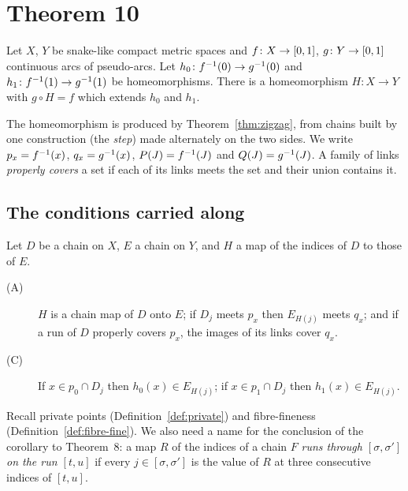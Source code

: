 \chapter{Theorem 10}\label{ch:thm10}

\begin{theorem}\label{thm:bj10}
Let $X$, $Y$ be snake-like compact metric spaces and $f\colon X\to[0,1]$, $g\colon Y\to[0,1]$ continuous arcs of pseudo-arcs. Let $h_0\colon f^{-1}(0)\to g^{-1}(0)$ and
$h_1\colon f^{-1}(1)\to g^{-1}(1)$ be homeomorphisms. There is a homeomorphism $H\colon X\to Y$ with $g\circ H=f$ which extends $h_0$ and $h_1$.
\end{theorem}


The homeomorphism is produced by Theorem~\ref{thm:zigzag}, from chains built by one construction (the \emph{step}) made alternately on the two sides. We write
$p_x=f^{-1}(x)$, $q_x=g^{-1}(x)$, $P(J)=f^{-1}(J)$ and $Q(J)=g^{-1}(J)$. A family of links \emph{properly covers} a set if each of its links meets the set and their union
contains it.

\section{The conditions carried along}

\begin{definition}\label{def:conditions}
Let $D$ be a chain on $X$, $E$ a chain on $Y$, and $H$ a map of the indices of $D$ to those of $E$.
\begin{description}
\item[\textnormal{(A)}] $H$ is a chain map of $D$ onto $E$; if $D_j$ meets $p_x$ then $E_{H(j)}$ meets $q_x$; and if a run of $D$ properly covers $p_x$, the images
of its links cover $q_x$.
\item[\textnormal{(C)}] If $x\in p_0\cap D_j$ then $h_0(x)\in E_{H(j)}$; if $x\in p_1\cap D_j$ then $h_1(x)\in E_{H(j)}$.
\end{description}
\end{definition}


Recall private points (Definition~\ref{def:private}) and fibre-fineness (Definition~\ref{def:fibre-fine}). We also need a name for the conclusion of the
corollary to Theorem~8: a map $R$ of the indices of a chain $F$ \emph{runs through $[\sigma,\sigma']$ on the run $[t,u]$} if every $j\in[\sigma,\sigma']$ is the value of $R$ at
three consecutive indices of $[t,u]$.

